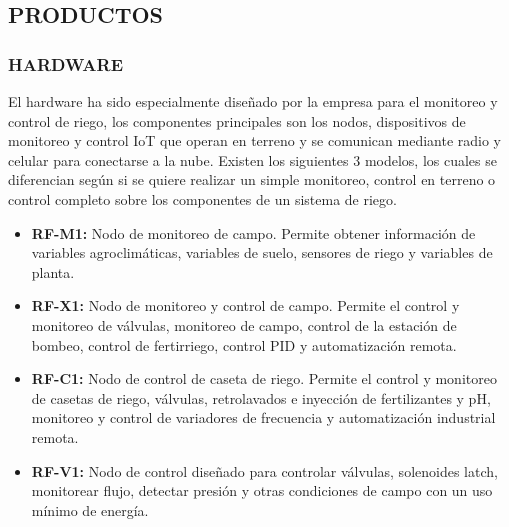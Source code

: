 \subsection{PRODUCTOS}
\subsubsection{HARDWARE}

El hardware ha sido especialmente diseñado por la empresa para el monitoreo y control de riego, los componentes principales son los nodos, dispositivos de monitoreo y control IoT que operan en terreno y se comunican mediante radio y celular para conectarse a la nube. Existen los siguientes 3 modelos, los cuales se diferencian según si se quiere realizar un simple monitoreo, control en terreno o control completo sobre los componentes de un sistema de riego.
\begin{itemize}
	\item \textbf{RF-M1:} Nodo de monitoreo de campo. Permite obtener información de variables agroclimáticas, variables de suelo, sensores de riego y variables de planta.
	\item \textbf{RF-X1:} Nodo de monitoreo y control de campo. Permite el control y monitoreo de válvulas, monitoreo de campo, control de la estación de bombeo, control de fertirriego, control PID y automatización remota.
	\item \textbf{RF-C1:} Nodo de control de caseta de riego. Permite el control y monitoreo de casetas de riego, válvulas, retrolavados e inyección de fertilizantes y pH, monitoreo y control de variadores de frecuencia y automatización industrial remota.
	\item \textbf{RF-V1:} Nodo de control diseñado para controlar válvulas, solenoides latch, monitorear flujo, detectar presión y otras condiciones de campo con un uso mínimo de energía.
\end{itemize}

